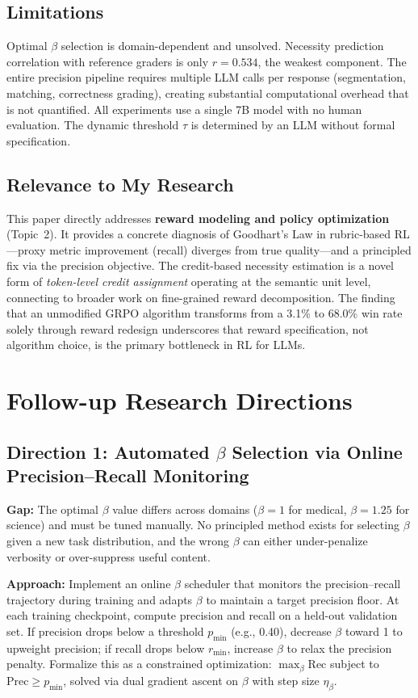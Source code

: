 \documentclass[11pt,a4paper]{article}
\begin{document}
\subsection{Limitations}
Optimal $\beta$ selection is domain-dependent and unsolved. Necessity prediction correlation with reference graders is only $r = 0.534$, the weakest component. The entire precision pipeline requires multiple LLM calls per response (segmentation, matching, correctness grading), creating substantial computational overhead that is not quantified. All experiments use a single 7B model with no human evaluation. The dynamic threshold $\tau$ is determined by an LLM without formal specification.

\subsection{Relevance to My Research}
This paper directly addresses \textbf{reward modeling and policy optimization} (Topic~2). It provides a concrete diagnosis of Goodhart's Law in rubric-based RL---proxy metric improvement (recall) diverges from true quality---and a principled fix via the precision objective. The credit-based necessity estimation is a novel form of \emph{token-level credit assignment} operating at the semantic unit level, connecting to broader work on fine-grained reward decomposition. The finding that an unmodified GRPO algorithm transforms from a 3.1\% to 68.0\% win rate solely through reward redesign underscores that reward specification, not algorithm choice, is the primary bottleneck in RL for LLMs.

\section{Follow-up Research Directions}

\subsection{Direction 1: Automated $\beta$ Selection via Online Precision--Recall Monitoring}
\textbf{Gap:} The optimal $\beta$ value differs across domains ($\beta = 1$ for medical, $\beta = 1.25$ for science) and must be tuned manually. No principled method exists for selecting $\beta$ given a new task distribution, and the wrong $\beta$ can either under-penalize verbosity or over-suppress useful content.

\textbf{Approach:} Implement an online $\beta$ scheduler that monitors the precision--recall trajectory during training and adapts $\beta$ to maintain a target precision floor. At each training checkpoint, compute precision and recall on a held-out validation set. If precision drops below a threshold $p_{\min}$ (e.g., 0.40), decrease $\beta$ toward 1 to upweight precision; if recall drops below $r_{\min}$, increase $\beta$ to relax the precision penalty. Formalize this as a constrained optimization: $\max_\beta \mathrm{Rec}$ subject to $\mathrm{Prec} \geq p_{\min}$, solved via dual gradient ascent on $\beta$ with step size $\eta_\beta$.
\end{document}
